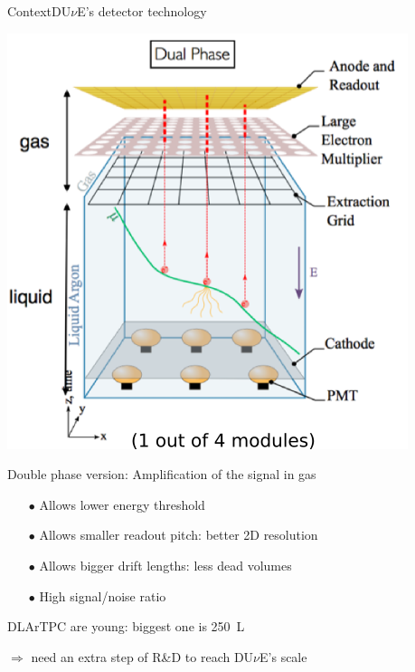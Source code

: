 \documentclass[10pt]{beamer}
\begin{document}
    \begin{frame}{Context}{DU$\nu$E's detector technology}
    	\begin{scriptsize}
    		\begin{minipage}{0.48\textwidth}
    			\includegraphics[width=\textwidth]{figures/contexte/dlartpc.png}\\
    		\end{minipage}
    		\hfill
    		\begin{minipage}{0.48\textwidth}
    			Double phase version: Amplification of the signal in gas
    			\begin{itemize}
    				\item[$\bullet$] Allows lower energy threshold
    				\item[$\bullet$] Allows smaller readout pitch: better 2D resolution
    				\item[$\bullet$] Allows bigger drift lengths: less dead volumes
    				\item[$\bullet$] High signal/noise ratio
    			\end{itemize}    			
    			DLArTPC are young: biggest one is \SI{250}{\liter}\\
    		\end{minipage}
    	\end{scriptsize}
    	$\Rightarrow$ need an extra step of R\&D to reach DU$\nu$E's scale
    \end{frame}
    
\end{document}
